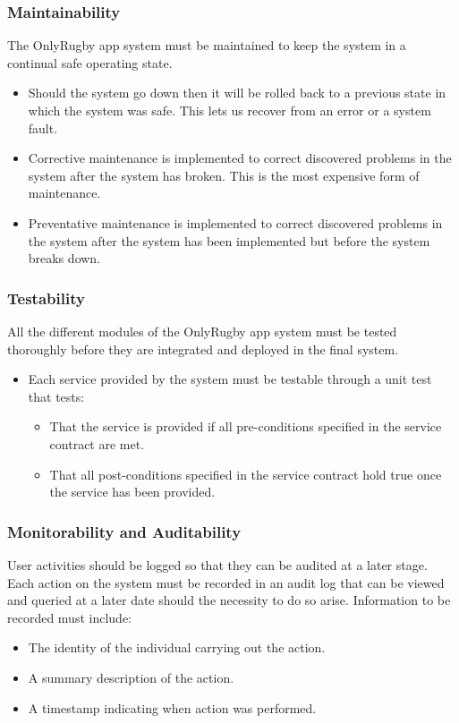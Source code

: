 \documentclass[hidelinks,a4paper,12pt]{article}
\begin{document}
	\subsubsection*{Maintainability}
	The OnlyRugby app system must be maintained to keep the system in a continual safe operating state.
	\begin{itemize}
		\item Should the system go down then it will be rolled back to a previous state in which the system was safe. This lets us recover from an error or a system fault.
		\item Corrective maintenance is implemented to correct discovered problems in the system after the system has broken. This is the most expensive form of maintenance.
		\item Preventative maintenance is implemented to correct discovered problems in the system after the system has been implemented but before the system breaks down.
	\end{itemize}
	
	\subsubsection*{Testability}
	All the different modules of the OnlyRugby app system must be tested thoroughly before they are integrated and deployed in the final system.
	\begin{itemize}
		\item Each service provided by the system must be testable through a unit test that tests:
		\begin{itemize}
			\item That the service is provided if all pre-conditions specified in the service contract are met.
			\item That all post-conditions specified in the service contract hold true once the service has been provided.
		\end{itemize}
	\end{itemize}
	
	\subsubsection*{Monitorability and Auditability}
	User activities should be logged so that they can be audited at a later stage. Each action on the system must be recorded in an audit log that can be viewed and queried at a later date should the necessity to do so arise.
	Information to be recorded must include:
	\begin{itemize}
		\item The identity of the individual carrying out the action.
		\item A summary description of the action.
		\item A timestamp indicating when action was performed.
	\end{itemize}
	
\end{document}
